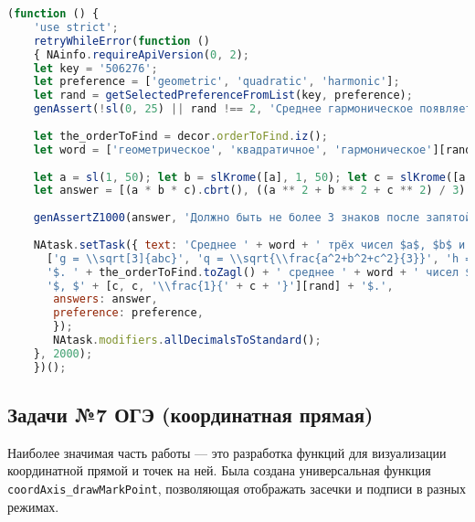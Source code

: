 \begin{lstlisting}[language=JavaScript]
(function () { 
    'use strict'; 
    retryWhileError(function () 
    { NAinfo.requireApiVersion(0, 2); 
    let key = '506276'; 
    let preference = ['geometric', 'quadratic', 'harmonic']; 
    let rand = getSelectedPreferenceFromList(key, preference);
    genAssert(!sl(0, 25) || rand !== 2, 'Среднее гармоническое появляется слишком часто'); 
     
    let the_orderToFind = decor.orderToFind.iz(); 
    let word = ['геометрическое', 'квадратичное', 'гармоническое'][rand]; 
     
    let a = sl(1, 50); let b = slKrome([a], 1, 50); let c = slKrome([a, b], 1, 50); 
    let answer = [(a * b * c).cbrt(), ((a ** 2 + b ** 2 + c ** 2) / 3).sqrt(), 3 / (a + b + c)][rand];
     
    genAssertZ1000(answer, 'Должно быть не более 3 знаков после запятой'); 
     
    NAtask.setTask({ text: 'Среднее ' + word + ' трёх чисел $a$, $b$ и $c$ вычисляется по формуле $ ' +
      ['g = \\sqrt[3]{abc}', 'q = \\sqrt{\\frac{a^2+b^2+c^2}{3}}', 'h = \\left(\\frac{\\frac{1}{a}+\\frac{1}{b}+\\frac{1}{c}}{3} \\right)^{-1}'][rand] + 
      '$. ' + the_orderToFind.toZagl() + ' среднее ' + word + ' чисел $' + [a, a, '\\frac{1}{' + a + '}'][rand] + '$, $' + [b, b, '\\frac{1}{' + b + '}'][rand] + 
      '$, $' + [c, c, '\\frac{1}{' + c + '}'][rand] + '$.',
       answers: answer, 
       preference: preference, 
       }); 
       NAtask.modifiers.allDecimalsToStandard();
    }, 2000); 
    })();
\end{lstlisting}

\subsection{Задачи №7 ОГЭ (координатная прямая)}

Наиболее значимая часть работы — это разработка функций для визуализации координатной прямой и точек на ней. 
Была создана универсальная функция \texttt{coordAxis\_drawMarkPoint}, позволяющая отображать засечки и подписи в разных режимах.
